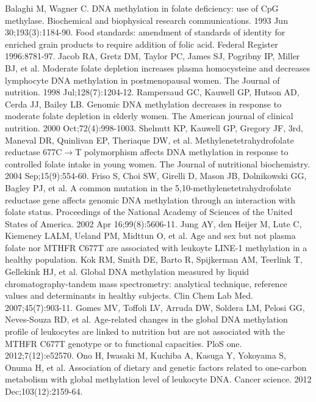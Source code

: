 \begin{thebibliography}{12}
		Balaghi M, Wagner C. DNA methylation in folate deficiency: use of CpG methylase. Biochemical and biophysical research communications. 1993 Jun 30;193(3):1184-90.
		Food standards: amendment of standards of identity for enriched grain products to require addition of folic acid.  Federal Register 1996:8781-97.
		Jacob RA, Gretz DM, Taylor PC, James SJ, Pogribny IP, Miller BJ, et al. Moderate folate depletion increases plasma homocysteine and decreases lymphocyte DNA methylation in postmenopausal women. The Journal of nutrition. 1998 Jul;128(7):1204-12.
		Rampersaud GC, Kauwell GP, Hutson AD, Cerda JJ, Bailey LB. Genomic DNA methylation decreases in response to moderate folate depletion in elderly women. The American journal of clinical nutrition. 2000 Oct;72(4):998-1003.
		Shelnutt KP, Kauwell GP, Gregory JF, 3rd, Maneval DR, Quinlivan EP, Theriaque DW, et al. Methylenetetrahydrofolate reductase 677C$\rightarrow$T polymorphism affects DNA methylation in response to controlled folate intake in young women. The Journal of nutritional biochemistry. 2004 Sep;15(9):554-60.
		Friso S, Choi SW, Girelli D, Mason JB, Dolnikowski GG, Bagley PJ, et al. A common mutation in the 5,10-methylenetetrahydrofolate reductase gene affects genomic DNA methylation through an interaction with folate status. Proceedings of the National Academy of Sciences of the United States of America. 2002 Apr 16;99(8):5606-11.
		Jung AY, den Heijer M, Lute C, Kiemeney LALM, Ueland PM, Midttun O, et al. Age and sex but not plasma folate nor MTHFR C677T are associated with leukoyte LINE-1 methylation in a healthy population.
		Kok RM, Smith DE, Barto R, Spijkerman AM, Teerlink T, Gellekink HJ, et al. Global DNA methylation measured by liquid chromatography-tandem mass spectrometry: analytical technique, reference values and determinants in healthy subjects. Clin Chem Lab Med. 2007;45(7):903-11.
		Gomes MV, Toffoli LV, Arruda DW, Soldera LM, Pelosi GG, Neves-Souza RD, et al. Age-related changes in the global DNA methylation profile of leukocytes are linked to nutrition but are not associated with the MTHFR C677T genotype or to functional capacities. PloS one. 2012;7(12):e52570.
		Ono H, Iwasaki M, Kuchiba A, Kasuga Y, Yokoyama S, Onuma H, et al. Association of dietary and genetic factors related to one-carbon metabolism with global methylation level of leukocyte DNA. Cancer science. 2012 Dec;103(12):2159-64.

\end{thebibliography}
